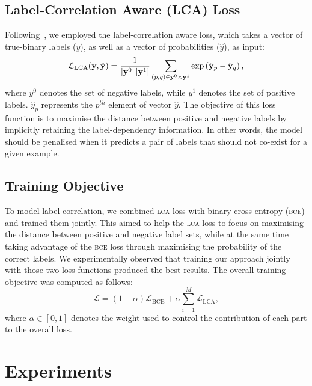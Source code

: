 \documentclass[11pt,a4paper]{article}
\begin{document}
\subsection{Label-Correlation Aware (LCA) Loss}
Following~, we employed the label-correlation aware loss, which takes a vector of true-binary labels ($y$), as well as a vector of probabilities ($\hat y$), as input:
\begin{equation}
\small
\mathcal{L}_\text{LCA}(\mathbf{y}, \hat{\mathbf{y}})=\frac{1}{\left|\mathbf{y}^{0}\right|\left|\mathbf{y}^{1}\right|} \sum_{(p, q) \in \mathbf{y}^{0} \times \mathbf{y}^{1}} \exp \left(\hat{\mathbf{y}}_{p}-\hat{\mathbf{y}}_{q}\right),
\end{equation}
where $y^{0}$ denotes the set of negative labels, while $y^{1}$ denotes the set of positive labels. $\hat y_{p}$ represents the $p^{th}$ element of vector $\hat y$. The objective of this loss function is to maximise the distance between positive and negative labels by implicitly retaining the label-dependency information. In other words, the model should be penalised when it predicts a pair of labels that should not co-exist for a given example.

\subsection{Training Objective}
To model label-correlation, we combined \textsc{lca} loss with binary cross-entropy (\textsc{bce}) and trained them jointly. This aimed to help the \textsc{lca} loss to focus on maximising the distance between positive and negative label sets, while at the same time taking advantage of the \textsc{bce} loss through maximising the probability of the correct labels. We experimentally observed that training our approach jointly with those two loss functions produced the best results. The overall training objective was computed as follows: 
\begin{equation}\label{equ:totloss}
\mathcal{L}= 
(1 - \alpha) \mathcal{L}_\text{BCE} +
\alpha \sum_{i=1}^{M} \mathcal{L}_\text{LCA},
\end{equation}
where $\alpha \in [0,1]$ denotes the weight used to control the contribution of each part to the overall loss.



\section{Experiments} \label{exp}
\end{document}
